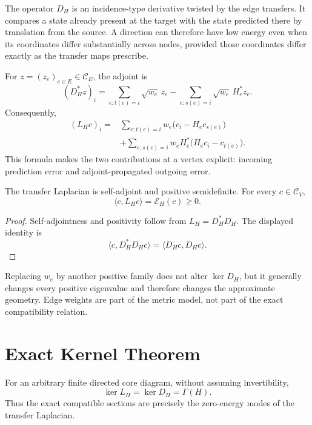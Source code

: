 The operator \(D_H\) is an incidence-type derivative twisted by the edge
transfers. It compares a state already present at the target with the state
predicted there by translation from the source. A direction can therefore
have low energy even when its coordinates differ substantially across nodes,
provided those coordinates differ exactly as the transfer maps prescribe.

For \(z=(z_e)_{e\in E}\in\mathcal C_E\), the adjoint is
\[
(D_H^*z)_i
=
\sum_{e:t(e)=i}\sqrt{w_e}\,z_e
-
\sum_{e:s(e)=i}\sqrt{w_e}\,H_e^*z_e.
\]
Consequently,
\[
\boxed{
\begin{aligned}
(L_Hc)_i
={}&
\sum_{e:t(e)=i}w_e\bigl(c_i-H_ec_{s(e)}\bigr)\\
&+
\sum_{e:s(e)=i}w_eH_e^*
\bigl(H_ec_i-c_{t(e)}\bigr).
\end{aligned}
}
\]
This formula makes the two contributions at a vertex explicit: incoming
prediction error and adjoint-propagated outgoing error.

\begin{SRWTproposition}\label{SRWT:prop:laplacian-positive}
The transfer Laplacian is self-adjoint and positive semidefinite. For every
\(c\in\mathcal C_V\),
\[
\langle c,L_Hc\rangle=\mathcal E_H(c)\geq0.
\]
\end{SRWTproposition}

\begin{proof}
Self-adjointness and positivity follow from \(L_H=D_H^*D_H\). The displayed
identity is
\[
\langle c,D_H^*D_Hc\rangle
=
\langle D_Hc,D_Hc\rangle.
\]
\end{proof}

\begin{SRWTremark}
Replacing \(w_e\) by another positive family does not alter \(\ker D_H\), but
it generally changes every positive eigenvalue and therefore changes the
approximate geometry. Edge weights are part of the metric model, not part of
the exact compatibility relation.
\end{SRWTremark}

\section{Exact Kernel Theorem}

\begin{SRWTtheorem}\label{SRWT:thm:laplacian-kernel}
For an arbitrary finite directed core diagram, without assuming invertibility,
\[
\boxed{
\ker L_H=\ker D_H=\Gamma(H).
}
\]
Thus the exact compatible sections are precisely the zero-energy modes of the
transfer Laplacian.
\end{SRWTtheorem}

